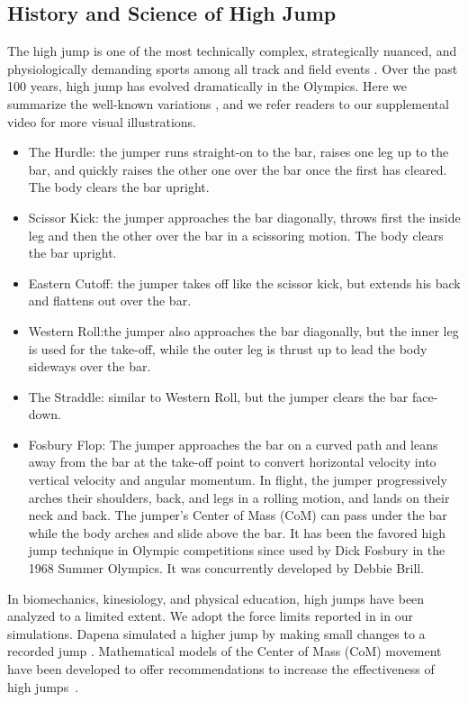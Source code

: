 \subsection{History and Science of High Jump}

The high jump is one of the most technically complex, strategically nuanced, and physiologically demanding sports among all track and field events \cite{Donnelly14}. Over the past 100 years, high jump has evolved dramatically in the Olympics. Here we summarize the well-known variations \cite{SevenStyles,Donnelly14}, and we refer readers to our supplemental video for more visual illustrations.
\begin{itemize}
    \item {The Hurdle}: the jumper runs straight-on to the bar, raises one leg up to the bar, and quickly raises the other one over the bar once the first has cleared. The body clears the bar upright.
    \item {Scissor Kick}: the jumper approaches the bar diagonally, throws first the inside leg and then the other over the bar in a scissoring motion. The body clears the bar upright.
    \item {Eastern Cutoff}: the jumper takes off like the scissor kick, but extends his back and flattens out over the bar.  
    \item {Western Roll}:the jumper also approaches the bar diagonally, but the inner leg is used for the take-off, while the outer leg is thrust up to lead the body sideways over the bar.
    \item {The Straddle}: similar to Western Roll, but the jumper clears the bar face-down.
    \item {Fosbury Flop}: The jumper approaches the bar on a curved path and leans away from the bar at the take-off point to convert horizontal velocity into vertical velocity and angular momentum. In flight, the jumper progressively arches their shoulders, back, and legs in a rolling motion, and lands on their neck and back. The jumper's Center of Mass (CoM) can pass under the bar while the body arches and slide above the bar. It has been the favored high jump technique in Olympic competitions since used by Dick Fosbury in the 1968 Summer Olympics. It was concurrently developed by Debbie Brill.
\end{itemize}

In biomechanics, kinesiology, and physical education, high jumps have been analyzed to a limited extent. We adopt the force limits reported in \cite{Okuyama03} in our simulations. Dapena simulated a higher jump by making small changes to a recorded jump \cite{Dapena02}. Mathematical models of the Center of Mass (CoM) movement have been developed to offer recommendations to increase the effectiveness of high jumps~\cite{Adashevskiy13}.
